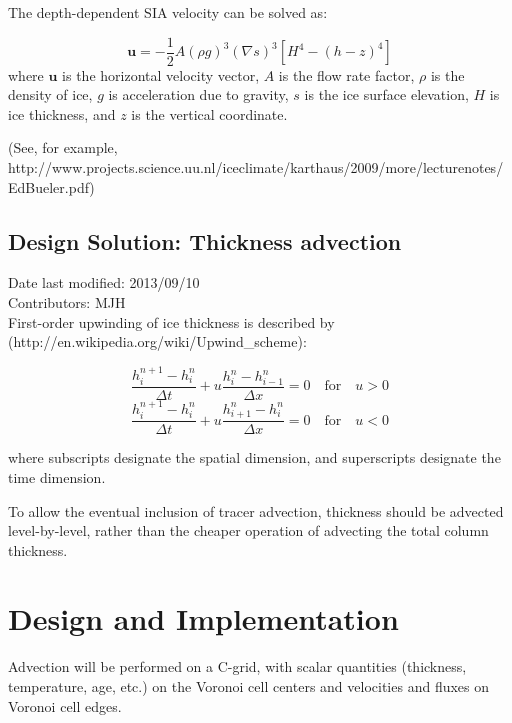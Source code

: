 \documentclass[11pt]{report}
\newcommand{\vect}[1]{\mathbf{#1}}
\begin{document}
The depth-dependent SIA velocity can be solved as:

\begin{equation}
    \label{sia}
	\vect{u} = -\frac{1}{2} A (\rho g )^3 (\nabla s)^3 \left[H^4 - (h-z)^4 \right]
\end{equation}
where $\vect{u}$ is the horizontal velocity vector, $A$ is the flow rate factor, $\rho$ is the density of ice, $g$ is acceleration due to gravity, $s$ is the ice surface elevation, $H$ is ice thickness, and $z$ is the vertical coordinate.

(See, for example, http://www.projects.science.uu.nl/iceclimate/karthaus/2009/more/lecturenotes/EdBueler.pdf)

\section{Design Solution: Thickness advection}
Date last modified: 2013/09/10 \\
Contributors: MJH \\

First-order upwinding of ice thickness is described by (http://en.wikipedia.org/wiki/Upwind\_scheme):

\begin{equation}
    \label{fouw}
 \frac{h_i^{n+1} - h_i^n}{\Delta t} + u \frac{h_i^n - h_{i-1}^n}{\Delta x} = 0 \quad \text{for} \quad u > 0
\end{equation}
\begin{equation}
 \frac{h_i^{n+1} - h_i^n}{\Delta t} + u \frac{h_{i+1}^n - h_i^n}{\Delta x} = 0 \quad \text{for} \quad u < 0
\end{equation}

where subscripts designate the spatial dimension, and superscripts designate the time dimension.

To allow the eventual inclusion of tracer advection, thickness should be advected level-by-level, rather than the cheaper operation of advecting the total column thickness.


\chapter{Design and Implementation}

Advection will be performed on a C-grid, with scalar quantities (thickness, temperature, age, etc.) on the Voronoi cell centers and velocities and fluxes on Voronoi cell edges.
\end{document}
